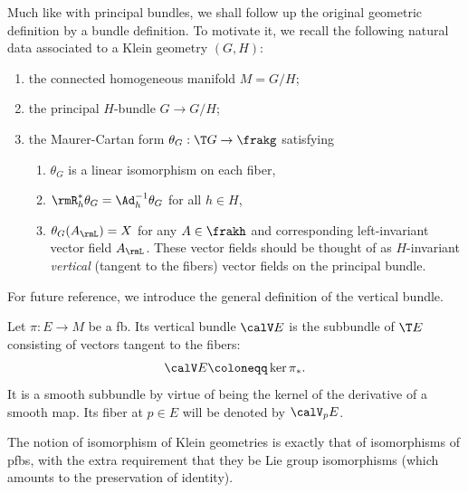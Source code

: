 


Much like with principal bundles, we shall follow up the original geometric definition by a bundle definition. To motivate it, we recall the following natural data associated to a Klein geometry $(G,H)$:
\begin{enumerate}[label=(\alph*)]
    \item the connected homogeneous manifold $M=G\slash H$;
    \item the principal $H$-bundle $G\to G\slash H$;
    \item the Maurer-Cartan form $\theta_G:\T G\to \frakg$ satisfying
    \begin{enumerate}[label=(\roman*)]
        \item $\theta_G$ is a linear isomorphism on each fiber,
        \item $\rmR_h^\ast \theta_G=\Ad_h^{-1}\theta_G$ for all $h\in H$,
        \item $\theta_G(A_\rmL)=X$ for any $A\in \frakh$ and corresponding left-invariant vector field $A_\rmL$. These vector fields should be thought of as $H$-invariant \emph{vertical} (tangent to the fibers) vector fields on the principal bundle.
    \end{enumerate}
\end{enumerate}

For future reference, we introduce the general definition of the vertical bundle.

\begin{defn}
    Let $\pi:E\to M$ be a \gls{fb}. Its vertical bundle $\calV E$ is the subbundle of $\T E$ consisting of vectors tangent to the fibers: 
    \[\calV E\coloneqq \ker \pi_\ast.\]
    It is a smooth subbundle by virtue of being the kernel of the derivative of a smooth map. Its fiber at $p\in E$ will be denoted by $\calV_p E$.
\end{defn}

The notion of isomorphism of Klein geometries is exactly that of isomorphisms of \glspl{pfb}, with the extra requirement that they be Lie group isomorphisms (which amounts to the preservation of identity).

